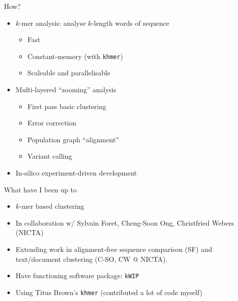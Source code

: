 \documentclass[t]{beamer}
\begin{document}
\begin{frame}{How?}
  \begin{itemize}
    \item $k$-mer analysis: analyse $k$-length words of sequence
    \begin{itemize}
      \item Fast
      \item Constant-memory (with \texttt{khmer})
      \item Scaleable and parallelisable
    \end{itemize}
  \pause
    \item Multi-layered ``zooming'' analysis
      \begin{itemize}
        \item First pass basic clustering
        \item Error correction
        \item Population graph ``alignment''
        \item Variant calling
      \end{itemize}
  \pause
    \item In-silico experiment-driven development
  \end{itemize}
\end{frame}

\begin{frame}{What have I been up to}
  \begin{itemize}
    \item $k$-mer based clustering
  \pause
    \item In collaboration w/ Sylvain Foret, Cheng-Soon Ong, Christfried
      Webers (NICTA)
  \pause
    \item Extending work in alignment-free sequence comparison (SF) and
      text/document clustering (C-SO, CW @ NICTA).
  \pause
    \item Have functioning software package: \texttt{kWIP}
  \pause
    \item Using Titus Brown's \texttt{khmer} (contributed a lot of code myself)
  \end{itemize}
\end{frame}
\end{document}
